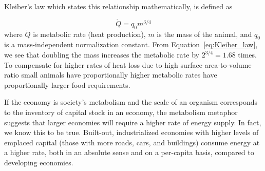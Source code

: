Kleiber's law which states this relationship mathematically,
is defined as

\begin{equation}\label{eq:Kleiber_law}
	\dot{Q} = q_{0} m^{3/4}
\end{equation}
%
where 
$\dot{Q}$ is metabolic rate (heat production),
$m$ is the mass of the animal, and
$q_{0}$ is a mass-independent normalization constant.
From Equation~\ref{eq:Kleiber_law},
we see that doubling the mass increases the metabolic rate by
$2^{3/4} = 1.68$ times.
To compensate for higher rates of heat loss due to high surface area-to-volume ratio
small animals have proportionally higher metabolic rates
have proportionally larger food requirements.

If the economy is society's metabolism and 
the scale of an organism corresponds to the inventory 
of capital stock in an economy, 
the metabolism metaphor suggests that larger economies 
will require a higher rate of energy supply.
In fact, we know this to be true.
Built-out, industrialized economies with higher levels of emplaced capital
(those with more roads, cars, and buildings)
consume energy at a higher rate, both in an absolute sense and on a per-capita basis,
compared to developing economies.


